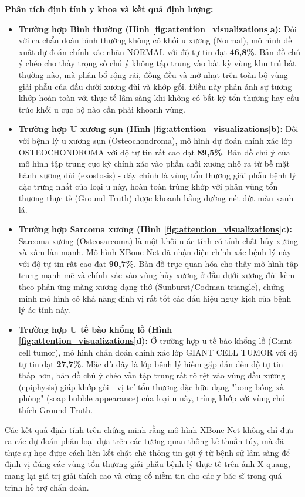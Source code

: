 \textbf{Phân tích định tính y khoa và kết quả định lượng:}
\begin{itemize}
    \item \textbf{Trường hợp Bình thường (Hình \ref{fig:attention_visualizations}a):} Đối với ca chẩn đoán bình thường không có khối u xương (Normal), mô hình đề xuất dự đoán chính xác nhãn NORMAL với độ tự tin đạt \textbf{46,8\%}. Bản đồ chú ý chéo cho thấy trọng số chú ý không tập trung vào bất kỳ vùng khu trú bất thường nào, mà phân bổ rộng rãi, đồng đều và mờ nhạt trên toàn bộ vùng giải phẫu của đầu dưới xương đùi và khớp gối. Điều này phản ánh sự tương khớp hoàn toàn với thực tế lâm sàng khi không có bất kỳ tổn thương hay cấu trúc khối u cục bộ nào cần phải khoanh vùng.
    \item \textbf{Trường hợp U xương sụn (Hình \ref{fig:attention_visualizations}b):} Đối với bệnh lý u xương sụn (Osteochondroma), mô hình dự đoán chính xác lớp OSTEOCHONDROMA với độ tự tin rất cao đạt \textbf{89,5\%}. Bản đồ chú ý của mô hình tập trung cực kỳ chính xác vào phần chồi xương nhô ra từ bề mặt hành xương đùi (exostosis) - đây chính là vùng tổn thương giải phẫu bệnh lý đặc trưng nhất của loại u này, hoàn toàn trùng khớp với phân vùng tổn thương thực tế (Ground Truth) được khoanh bằng đường nét đứt màu xanh lá.
    \item \textbf{Trường hợp Sarcoma xương (Hình \ref{fig:attention_visualizations}c):} Sarcoma xương (Osteosarcoma) là một khối u ác tính có tính chất hủy xương và xâm lấn mạnh. Mô hình XBone-Net đã nhận diện chính xác bệnh lý này với độ tự tin rất cao đạt \textbf{90,7\%}. Bản đồ trực quan hóa cho thấy mô hình tập trung mạnh mẽ và chính xác vào vùng hủy xương ở đầu dưới xương đùi kèm theo phản ứng màng xương dạng thớ (Sunburst/Codman triangle), chứng minh mô hình có khả năng định vị rất tốt các dấu hiệu nguy kịch của bệnh lý ác tính này.
    \item \textbf{Trường hợp U tế bào khổng lồ (Hình \ref{fig:attention_visualizations}d):} Ở trường hợp u tế bào khổng lồ (Giant cell tumor), mô hình chẩn đoán chính xác lớp GIANT CELL TUMOR với độ tự tin đạt \textbf{27,7\%}. Mặc dù đây là lớp bệnh lý hiếm gặp dẫn đến độ tự tin thấp hơn, bản đồ chú ý chéo vẫn tập trung rất rõ rệt vào vùng đầu xương (epiphysis) giáp khớp gối - vị trí tổn thương đặc hữu dạng "bong bóng xà phòng" (soap bubble appearance) của loại u này, trùng khớp với vùng chú thích Ground Truth.
\end{itemize}

Các kết quả định tính trên chứng minh rằng mô hình XBone-Net không chỉ đưa ra các dự đoán phân loại dựa trên các tương quan thống kê thuần túy, mà đã thực sự học được cách liên kết chặt chẽ thông tin gợi ý từ bệnh sử lâm sàng để định vị đúng các vùng tổn thương giải phẫu bệnh lý thực tế trên ảnh X-quang, mang lại giá trị giải thích cao và củng cố niềm tin cho các y bác sĩ trong quá trình hỗ trợ chẩn đoán.